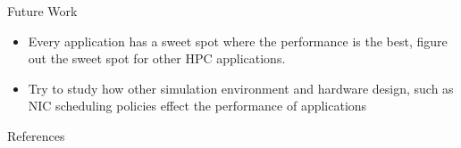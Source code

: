 \documentclass[final]{beamer}
\newlength{\onecolwid}
\begin{document}
\begin{frame}[t]
\begin{columns}[t]
\begin{column}{\onecolwid}

\begin{block}{Future Work}
\begin{itemize}
\item Every application has a sweet spot where the performance is the best, figure out the sweet spot for other HPC applications.
\vspace{\baselineskip}
\vspace{\baselineskip}
\item Try to study how other simulation environment and hardware design, such as NIC scheduling policies effect the performance of applications
\end{itemize}
\end{block}


\begin{block}{References}

\nocite{*} %
\small{
\vspace{0.55in}}
\vspace{-0.5em}
\small{} 
\end{block}


\end{column} %

\end{columns} %

\end{frame} %
\end{document}
